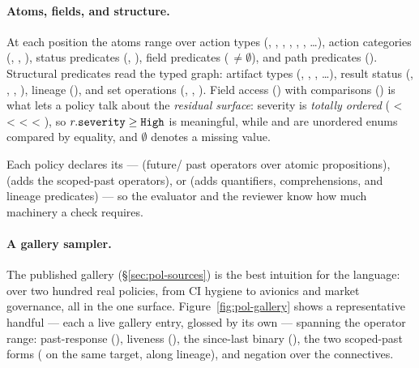 \paragraph{Atoms, fields, and structure.}
At each position the atoms range over action types (,
, , , ,
, \ldots), action categories (, ,
), status predicates (, ), field
predicates (\,\(\neq \emptyset\)), and path predicates
(). Structural predicates read the typed graph:
artifact types (, ,
, \ldots), result status (, ,
, ), lineage (), and set
operations (, , ). Field access
() with comparisons () is what lets a policy talk about
the \emph{residual surface}: severity is \emph{totally ordered}
( <  <  <  < ), so
\(r.\code{severity} \ge \code{High}\) is meaningful, while  and
 are unordered enums compared by equality, and \(\emptyset\) denotes
a missing value.

Each policy declares its  ---  (future/
past operators over atomic propositions),  (adds the
scoped-past operators), or  (adds quantifiers, comprehensions,
and lineage predicates) --- so the evaluator and the reviewer know how much
machinery a check requires.

\paragraph{A gallery sampler.}
The published gallery (\S\ref{sec:pol-sources}) is the best intuition for the
language: over two hundred real policies, from CI hygiene to avionics and market
governance, all in the one surface. Figure~\ref{fig:pol-gallery} shows a
representative handful --- each a live gallery entry, glossed by its own
 --- spanning the operator range: past-response (),
liveness (), the since-last binary (), the two scoped-past
forms ( on the same target,  along lineage), and
negation over the connectives.

